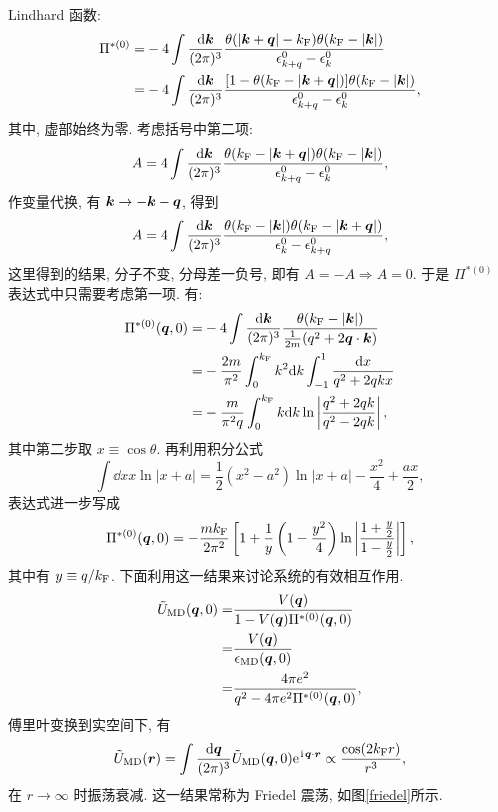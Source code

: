 Lindhard 函数: 
 \begin{align}
        \Pi^{*(0)}=&-4\int\frac{\mathrm{d}\boldsymbol{k}}{(2\pi)^3}\frac{\theta(|\boldsymbol{k}+\boldsymbol{q}|-k_{\mathrm{F}})\theta(k_{\mathrm{F}}-|\boldsymbol{k}|)}{\epsilon_{k+q}^0-\epsilon_k^0}\nonumber\\
        =&-4\int\frac{\mathrm{d} \boldsymbol{k}}{(2\pi)^3}\frac{[1-\theta(k_{\mathrm{F}}-|\boldsymbol{k}+\boldsymbol{q}|)]\theta(k_{\mathrm{F}}-|\boldsymbol{k}|)}{\epsilon_{k+q}^0-\epsilon_k^0},
    \end{align}
其中, 虚部始终为零. 考虑括号中第二项: 
\begin{equation}
        A=4\int\frac{\mathrm{d}\boldsymbol{k}}{(2\pi)^3}\frac{\theta(k_{\mathrm{F}}-|\boldsymbol{k}+\boldsymbol{q}|)\theta(k_{\mathrm{F}}-|\boldsymbol{k}|)}{\epsilon_{k+q}^0-\epsilon_k^0},
\end{equation}
作变量代换, 有 $\boldsymbol{k}\to -\boldsymbol{k}-\boldsymbol{q}$, 得到 
\begin{equation}
    A=4\int\frac{\mathrm{d}\boldsymbol{k}}{(2\pi)^3}\frac{\theta(k_{\mathrm{F}}-|\boldsymbol{k}|)\theta(k_{\mathrm{F}}-|\boldsymbol{k}+\boldsymbol{q}|)}{\epsilon_k^0-\epsilon_{k+q}^0},
\end{equation}
这里得到的结果, 分子不变, 分母差一负号, 即有 $A=-A\Rightarrow A=0$. 于是 $\Pi^{*(0)}$ 表达式中只需要考虑第一项. 有:
\begin{align}
        \Pi^{*(0)}(\boldsymbol{q},0)=&-4\int\frac{\mathrm{d} \boldsymbol{k}}{(2\pi)^3}\frac{\theta(k_{\mathrm{F}}-|\boldsymbol{k}|)}{\frac{1}{2m}(q^2+2\boldsymbol{q}\cdot \boldsymbol{k})}\nonumber\\
        =&-\frac{2m}{\pi^2}\int_0^{k_{\mathrm{F}}}k^2\mathrm{d} k\int_{-1}^1\frac{\mathrm{d} x}{q^2+2qkx}\nonumber\\
        =&-\frac{m}{\pi^2 q}\int_0^{k_{\mathrm{F}}}k\mathrm{d} k\ln\left| \frac{q^2+2qk}{q^2-2qk} \right|,
    \end{align}
其中第二步取 $x\equiv \cos\theta$. 再利用积分公式 
\begin{equation}
    \int\dd x x\ln|x+a|=\frac{1}{2}(x^2-a^2)\ln|x+a|-\frac{x^2}{4}+\frac{ax}{2},
\end{equation}
表达式进一步写成 
\begin{equation}
    \Pi^{*(0)}(\boldsymbol{q},0)=-\frac{mk_{\mathrm{F}}}{2\pi^2}\left[ 1+\frac{1}{y}\left( 1-\frac{y^2}{4} \right)\ln\left| \frac{1+\frac{y}{2}}{1-\frac{y}{2}} \right| \right],
\end{equation}
其中有 $y\equiv q/k_{\mathrm{F}}$. 下面利用这一结果来讨论系统的有效相互作用.
 \begin{align}
        \tilde U_{\mathrm{MD}}(\boldsymbol{q},0)=&\frac{V(\boldsymbol{q})}{1-V(\boldsymbol{q})\Pi^{*(0)}(\boldsymbol{q},0)}\nonumber\\
        =&\frac{V(\boldsymbol{q})}{\epsilon_{\mathrm{MD}}(\boldsymbol{q},0)}\nonumber\\
        =&\frac{4\pi e^2}{q^2-4\pi e^2\Pi^{*(0)}(\boldsymbol{q},0)},
    \end{align}
傅里叶变换到实空间下, 有 
\begin{equation}
    \tilde U_{\mathrm{MD}}(\boldsymbol{r})=\int\frac{\mathrm{d}\boldsymbol{q}}{(2\pi)^3}\tilde U_{\mathrm{MD}}(\boldsymbol{q},0)\mathrm{e}^{\hspace{0.1em}\mathrm{i}\hspace{0.1em}\boldsymbol{q}\cdot \boldsymbol{r}}\propto \frac{\cos(2k_{\mathrm{F}}r)}{r^3},
\end{equation}
在 $r\to \infty$ 时振荡衰减. 这一结果常称为 Friedel 震荡, 如图\ref{friedel}所示. 


